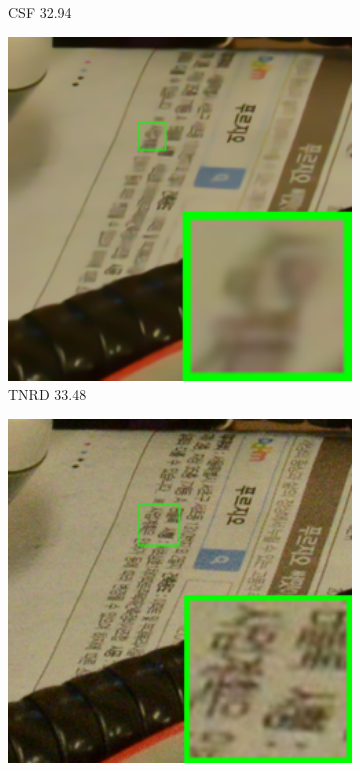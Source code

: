 \begin{figure}
\begin{subfigure}[t]{0.19\textwidth}
\caption{CSF 32.94}
    \end{subfigure}
    \hfill
    \begin{subfigure}[t]{0.19\textwidth}
        \centering
        \includegraphics[width=1\textwidth]{images/guided/cc60/resize_br_TRD_CC_Noisy_Nikon_D800_ISO_3200_A1_111.png}
\caption{TNRD 33.48}
    \end{subfigure}
\hfill
    \begin{subfigure}[t]{0.19\textwidth}
        \centering
        \includegraphics[width=1\textwidth]{images/guided/cc60/resize_br_DnCNN_CC_Noisy_Nikon_D800_ISO_3200_A1_111.png}

\end{subfigure}
\end{figure}

